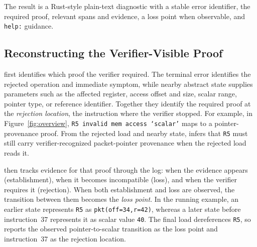 The result is a Rust-style plain-text diagnostic with a stable error identifier, the required proof, relevant spans and evidence, a loss point when observable, and \texttt{help:} guidance.

\subsection{Reconstructing the Verifier-Visible Proof}
\label{sec:design-proof}

\sys first identifies which proof the verifier required.
The terminal error identifies the rejected operation and immediate symptom, while nearby abstract state supplies parameters such as the affected register, access offset and size, scalar range, pointer type, or reference identifier.
Together they identify the required proof at the \emph{rejection location}, the instruction where the verifier stopped.
For example, in Figure~\ref{fig:overview}, \texttt{R5 invalid mem access `scalar'} maps to a pointer-provenance proof.
From the rejected load and nearby state, \sys infers that \texttt{R5} must still carry verifier-recognized packet-pointer provenance when the rejected load reads it.

\sys then tracks evidence for that proof through the log: when the evidence appears (establishment), when it becomes incompatible (loss), and when the verifier requires it (rejection).
When both establishment and loss are observed, the transition between them becomes the \emph{loss point}.
In the running example, an earlier state represents \texttt{R5} as \texttt{pkt(off=34,r=42)}, whereas a later state before instruction~37 represents it as scalar value \texttt{40}.
The final load dereferences \texttt{R5}, so \sys reports the observed pointer-to-scalar transition as the loss point and instruction~37 as the rejection location.


